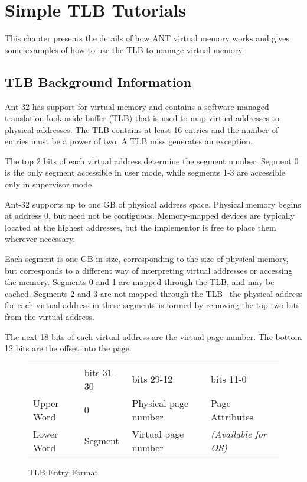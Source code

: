


\chapter{Simple TLB Tutorials}

This chapter presents the details of how ANT virtual memory works and
gives some examples of how to use the TLB to manage virtual memory.

\section{TLB Background Information}

Ant-32 has support for virtual memory and contains a software-managed translation 
look-aside buffer (TLB) that is used to map virtual addresses to physical 
addresses. The TLB contains at least 16 entries and the number of entries 
must be a power of two. A TLB miss generates an exception.

The top 2 bits of each virtual address determine the segment number.
Segment 0 is the only segment accessible in user mode, while
segments 1-3 are accessible only in supervisor mode.

Ant-32 supports up to one GB of physical address space.  Physical
memory begins at address 0, but need not be contiguous.  Memory-mapped
devices are typically located at the highest addresses, but the
implementor is free to place them wherever necessary.

Each segment is one GB in size, corresponding to the size of physical
memory, but corresponds to a different way of interpreting virtual
addresses or accessing the memory.  Segments 0 and 1 are mapped
through the TLB, and may be cached.  Segments 2 and 3 are not mapped
through the TLB-- the physical address for each virtual address in
these segments is formed by removing the top two bits from the virtual
address.  

The next 18 bits of each virtual address are the virtual page number.
The bottom 12 bits are the offset into the page.

\begin{figure}[ht]
\caption{TLB Entry Format}

\begin{center}
\begin{tabular}{l|p{0.7in}|p{1.5in}|p{1.2in}|}
\cline{2-4}
                & bits 31-30 & bits 29-12       & bits 11-0 \\
\cline{2-4}
Upper Word      & 0     & Physical page number  & Page Attributes \\
\cline{2-4}
Lower Word      & Segment & Virtual page number & {\em (Available for OS)} \\
\cline{2-4}
\end{tabular}
\end{center}
\end{figure}

